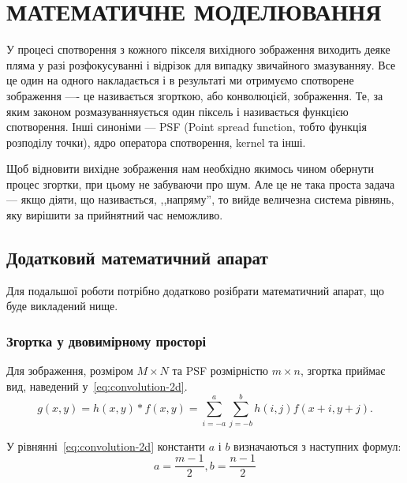 \documentclass{diploma}
\begin{document}
      \clearpage
\chapter{МАТЕМАТИЧНЕ МОДЕЛЮВАННЯ}
  У процесі спотворення з кожного пікселя вихідного зображення виходить деяке
  пляма у разі розфокусуванні і відрізок для випадку звичайного змазуванняу.
  Все це один на одного накладається і в результаті ми отримуємо спотворене
  зображення ---- це називається згорткою, або конволюцієй, зображення.
  Те, за яким законом розмазуванняується один піксель і називається функцією
  спотворення.
  Інші синоніми --- PSF (Point spread function, тобто функція розподілу
  точки), ядро оператора спотворення, kernel та інші.

  Щоб відновити вихідне зображення нам необхідно якимось чином обернути процес
  згортки, при цьому не забуваючи про шум.
  Але це не така проста задача --- якщо діяти, що називається, ,,напряму'', то
  вийде величезна система рівнянь, яку вирішити за прийнятний час неможливо.
  \section{Додатковий математичний апарат}
    Для подальшої роботи потрібно додатково розібрати математичний апарат, що
    буде викладений нище.
    \subsection{Згортка у двовимірному просторі}
      Для зображення, розміром $M \times N$ та PSF розмірністю $m \times n$,
      згортка приймає вид, наведений у~\eqref{eq:convolution-2d}.\cite{knuth}
      \begin{equation}
        g\left( x, y \right) = h\left( x, y \right) \ast f\left( x, y \right)
        = \sum_{i=-a}^a \sum_{j = -b}^b h\left( i, j \right) f\left( x + i, y
        + j \right).
        \label{eq:convolution-2d}
      \end{equation}

      У рівнянні~\eqref{eq:convolution-2d} константи $a$ і $b$ визначаються з
      наступних формул:
      \begin{equation*}
        a = \frac{m - 1}{2}, b = \frac{n - 1}{2}
      \end{equation*}
\end{document}
